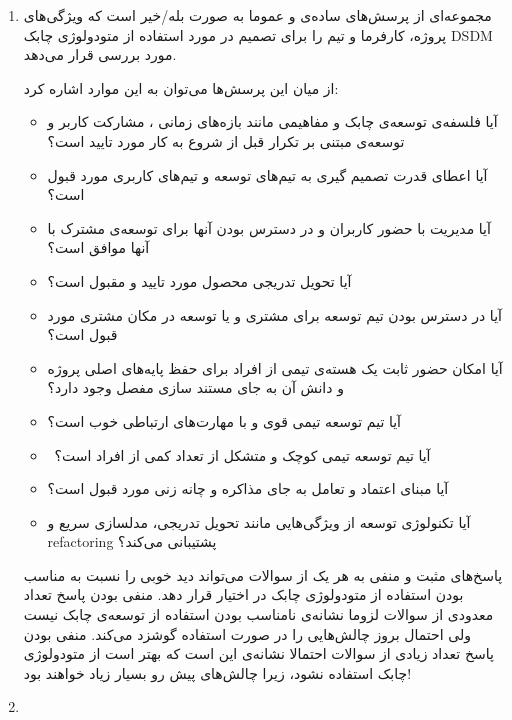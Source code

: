 \begin{enumerate}[i]
\item \textbf{} \newline
مجموعه‌ای از پرسش‌های ساده‌ی و عموما به صورت بله/خیر است که ویژگی‌های پروژه، کارفرما و تیم را برای تصمیم در مورد استفاده از متودولوژی چابک DSDM مورد بررسی قرار می‌دهد.

از میان این پرسش‌ها می‌توان به این موارد اشاره کرد:

\begin{itemize}
\item 
آیا فلسفه‌ی توسعه‌ی چابک و مفاهیمی مانند بازه‌های زمانی
، مشارکت کاربر
و توسعه‌ی مبتنی بر تکرار
قبل از شروع به کار مورد تایید است؟
\item
آیا اعطای قدرت تصمیم گیری به تیم‌های توسعه و تیم‌های کاربری مورد قبول است؟
\item
آیا مدیریت با حضور کاربران و در دسترس بودن آنها برای توسعه‌ی مشترک با آنها موافق است؟
\item
آیا تحویل تدریجی 
محصول مورد تایید و مقبول است؟
\item
آیا در دسترس بودن تیم توسعه برای مشتری و یا توسعه در مکان مشتری مورد قبول است؟
\item
آیا امکان حضور ثابت یک هسته‌ی تیمی از افراد برای حفظ پایه‌های اصلی پروژه و دانش آن به جای مستند سازی مفصل وجود دارد؟
\item
آیا تیم توسعه تیمی قوی و با مهارت‌‌های ارتباطی خوب است؟
\item
 آیا تیم توسعه تیمی کوچک و متشکل از تعداد کمی از افراد است؟
\item
آیا مبنای اعتماد و تعامل به جای مذاکره و چانه زنی مورد قبول است؟
\item
آیا تکنولوژی توسعه از ویژگی‌هایی مانند تحویل تدریجی، مدلسازی سریع و refactoring پشتیبانی می‌کند؟
 
\end{itemize}

پاسخ‌های مثبت و منفی به هر یک از سوالات می‌تواند دید خوبی را نسبت به مناسب بودن استفاده از متودولوژی چابک در اختیار قرار دهد. منفی بودن پاسخ تعداد معدودی از سوالات لزوما نشانه‌ی نامناسب بودن استفاده از توسعه‌ی چابک نیست ولی احتمال بروز چالش‌هایی را در صورت استفاده گوشزد می‌کند. منفی بودن پاسخ تعداد زیادی از سوالات احتمالا نشانه‌ی این است که بهتر است از متودولوژی چابک استفاده نشود، زیرا چالش‌های پیش رو بسیار زیاد خواهند بود!

\item \textbf{} \newline


\end{enumerate}
